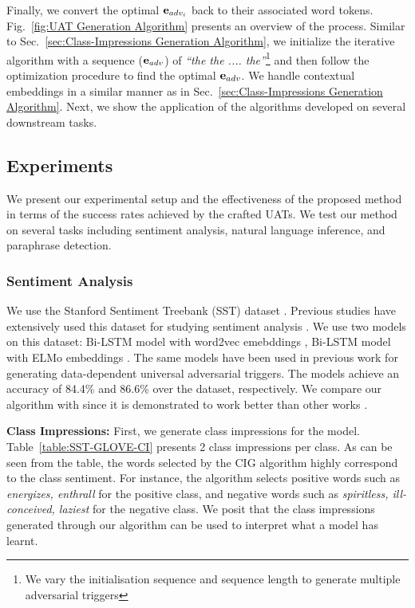 Finally, we convert the optimal $\boldsymbol{\mathbf{e}}_{adv_i}$ back to their associated word tokens. Fig.~\ref{fig:UAT Generation Algorithm} presents an overview of the process. Similar to Sec.~\ref{sec:Class-Impressions Generation Algorithm}, we initialize the iterative algorithm with a sequence ($\boldsymbol{\mathbf{e}}_{adv}$) of \textit{``the the .... the''}\footnote{We vary the initialisation sequence and sequence length to generate multiple adversarial triggers} and then follow the optimization procedure to find the optimal $\boldsymbol{\mathbf{e}}_{adv}$. We handle contextual embeddings in a similar manner as in Sec.~\ref{sec:Class-Impressions Generation Algorithm}. Next, we show the application of the algorithms developed on several downstream tasks.

\subsection{Experiments}
\label{sec:experiments}
We present our experimental setup and the effectiveness of the proposed method in terms of the success rates achieved by the crafted UATs. We test our method on several tasks including sentiment analysis, natural language inference, and paraphrase detection.


\subsubsection{Sentiment Analysis}
\label{sec:sentiment analysis}
We use the Stanford Sentiment Treebank (SST) dataset \cite{socher2013recursive}. Previous studies have extensively used this dataset for studying sentiment analysis \cite{devlin2018bert,cambria2013new}. We use two models on this dataset: Bi-LSTM model \cite{graves2005framewise} with word2vec emebddings \cite{mikolov2017advances}, Bi-LSTM model with ELMo embeddings \cite{peters2018deep}. The same models have been used in previous work \cite{wallace2019universal} for generating data-dependent universal adversarial triggers. The models achieve an accuracy of 84.4\% and 86.6\% over the dataset, respectively. We compare our algorithm with \cite{wallace2019universal} since it is demonstrated to work better than other works \cite{behjati2019universal}.

\noindent\textbf{Class Impressions:} First, we generate class impressions for the model. Table~\ref{table:SST-GLOVE-CI} presents 2 class impressions per class. As can be seen from the table, the words selected by the CIG algorithm highly correspond to the class sentiment. For instance, the algorithm selects positive words such as {\em energizes, enthrall} for the positive class, and negative words such as {\em spiritless, ill-conceived, laziest} for the negative class. We posit that the class impressions generated through our algorithm can be used to interpret what a model has learnt.


